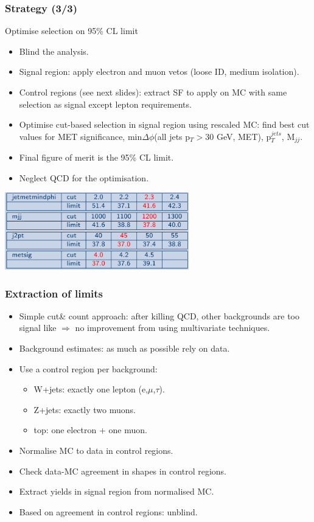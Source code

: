 \documentclass[red,compress,xcolor=table]{beamer}
\begin{document}
\begin{frame}
\frametitle{Strategy (3/3)}
\begin{block}{\centering Optimise selection on 95\% CL limit}
\begin{itemize}
\item \scriptsize Blind the analysis.
\item \scriptsize Signal region: apply electron and muon vetos (loose ID, medium isolation).
\item \scriptsize Control regions (see next slides): extract SF to apply on MC with same selection as signal except lepton requirements.
\item \scriptsize Optimise cut-based selection in signal region using rescaled MC: find best cut values for MET significance, min$\Delta\phi$(all jets p$_T>30$ GeV, MET), p$_T^{jets}$, M$_{jj}$.
\item \scriptsize Final figure of merit is the 95\% CL limit.
\item \scriptsize Neglect QCD for the optimisation.
\end{itemize}
\end{block}
\centering \includegraphics[width=0.6\textwidth]{./tableOptim.png}

\end{frame}

\begin{frame}
\frametitle{Extraction of limits}

\begin{itemize}
\item \scriptsize Simple cut\& count approach: after killing QCD, other backgrounds are too signal like $\Rightarrow$ no improvement from using multivariate techniques.
\item \scriptsize Background estimates: as much as possible rely on data.
\item \scriptsize Use a control region per background:
  \begin{itemize}
  \item \scriptsize W+jets: exactly one lepton (e,$\mu$,$\tau$).
  \item \scriptsize Z+jets: exactly two muons.
  \item \scriptsize top: one electron + one muon.
  \end{itemize}
\item \scriptsize Normalise MC to data in control regions.
\item \scriptsize Check data-MC agreement in shapes in control regions.
\item \scriptsize Extract yields in signal region from normalised MC.
\item \scriptsize Based on agreement in control regions: unblind.
\end{itemize}

\end{frame}
\end{document}
